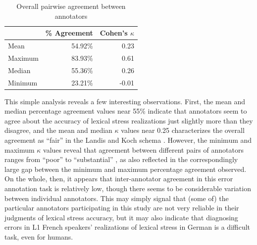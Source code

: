 \documentclass[a4paper]{article}
\begin{document}
		\begin{table}
			\centering
			\caption{Overall pairwise agreement between annotators}
			\begin{tabular}{lrr}
			\toprule
				&	\% Agreement	&	Cohen's $\kappa$	\\
			\midrule
Mean		&	54.92\%	&	0.23	\\
Maximum	&	83.93\%	&	0.61	\\
Median		&	55.36\%	&	0.26	\\
Minimum	&	23.21\%	&	-0.01	\\
			\bottomrule
			\end{tabular}						
			\label{tab:agreement:overall}
		\end{table}
		
		This simple analysis reveals a few interesting observations. First, the mean and median percentage agreement values near 55\% indicate that annotators seem to agree about the accuracy of lexical stress realizations just slightly more than they disagree, and the mean and median $\kappa$ values near 0.25 characterizes the overall agreement as ``fair'' in the Landis and Koch schema \cite{Landis1977}. However, the minimum and maximum $\kappa$ values reveal that agreement between different pairs of annotators ranges from ``poor'' to ``substantial'' \cite{Landis1977}, as also reflected in the correspondingly large gap between the minimum and maximum percentage agreement observed.
		On the whole, then, it appears that inter-annotator agreement in this error annotation task is relatively low, though there seems to be considerable variation between individual annotators. This may simply signal that (some of) the particular annotators participating in this study are not very reliable in their judgments of lexical stress accuracy, but it may also indicate that diagnosing errors in L1 French speakers' realizations of lexical stress in German is a difficult task, even for humans.
	
\end{document}
